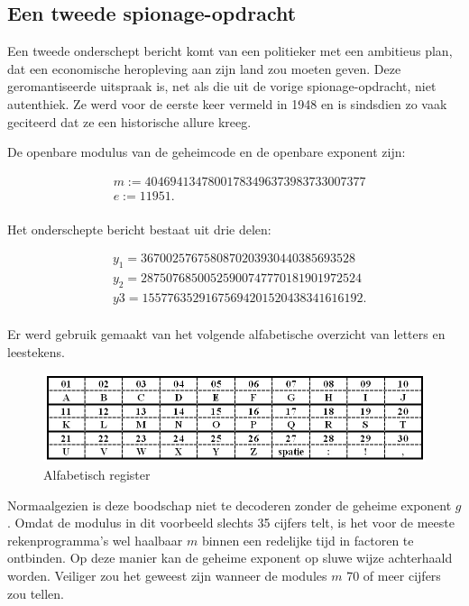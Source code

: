\subsection{Een tweede spionage-opdracht}

Een tweede onderschept bericht komt van een politieker met een ambitieus plan, dat een economische heropleving aan zijn land zou moeten geven. Deze geromantiseerde uitspraak is, net als die uit de vorige spionage-opdracht, niet autenthiek. Ze werd voor de eerste keer vermeld in 1948 en is sindsdien zo vaak geciteerd dat ze een historische allure kreeg. 

De openbare modulus van de geheimcode en de openbare exponent zijn:

\[
\begin{aligned}
&m:=40469413478001783496373983733007377\\
&e:= 11951.\\
\end{aligned}
\]

\noindent Het onderschepte bericht bestaat uit drie delen:

\[
\begin{aligned}
&y_1= 3670025767580870203930440385693528\\
&y_2= 28750768500525900747770181901972524\\
&y3= 15577635291675694201520438341616192.\\
\end{aligned}
\]

\noindent Er werd gebruik gemaakt van het volgende alfabetische overzicht van letters en leestekens.

\begin{figure} [h]
\label{alfabet2}
\centering
\includegraphics[width=\textwidth]{alfabet2.jpg}
\caption{Alfabetisch register}
\end{figure}

Normaalgezien is deze boodschap niet te decoderen zonder de geheime exponent $g$. Omdat de modulus in dit voorbeeld slechts 35 cijfers telt, is het voor de meeste rekenprogramma's wel haalbaar $m$ binnen een redelijke tijd in factoren te ontbinden. Op deze manier kan de geheime exponent op sluwe wijze achterhaald worden. Veiliger zou het geweest zijn wanneer de modules $m$ 70 of meer cijfers zou tellen.


